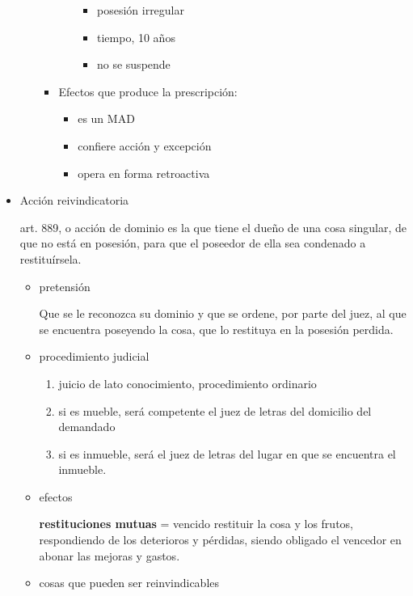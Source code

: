 \documentclass[]{article}
\providecommand{\tightlist}{%
  \setlength{\itemsep}{0pt}\setlength{\parskip}{0pt}}
\begin{document}
\begin{itemize}
\begin{itemize}
\begin{itemize}
\begin{itemize}
        \begin{itemize}
        \tightlist
        \item
          posesión irregular
        \item
          tiempo, 10 años
        \item
          no se suspende
        \end{itemize}
      \end{itemize}
    \item
      Efectos que produce la prescripción:

      \begin{itemize}
      \tightlist
      \item
        es un MAD
      \item
        confiere acción y excepción
      \item
        opera en forma retroactiva
      \end{itemize}
    \end{itemize}
  \end{itemize}
\item
  Acción reivindicatoria

  art. 889, o acción de dominio es la que tiene el dueño de una cosa
  singular, de que no está en posesión, para que el poseedor de ella sea
  condenado a restituírsela.

  \begin{itemize}
  \item
    pretensión

    Que se le reconozca su dominio y que se ordene, por parte del juez,
    al que se encuentra poseyendo la cosa, que lo restituya en la
    posesión perdida.
  \item
    procedimiento judicial

    \begin{enumerate}
    \def\labelenumi{\arabic{enumi}.}
    \tightlist
    \item
      juicio de lato conocimiento, procedimiento ordinario
    \item
      si es mueble, será competente el juez de letras del domicilio del
      demandado
    \item
      si es inmueble, será el juez de letras del lugar en que se
      encuentra el inmueble.
    \end{enumerate}
  \item
    efectos

    \textbf{restituciones mutuas} = vencido restituir la cosa y los
    frutos, respondiendo de los deterioros y pérdidas, siendo obligado
    el vencedor en abonar las mejoras y gastos.
  \item
    cosas que pueden ser reinvindicables


\end{itemize}
\end{itemize}
\end{document}
